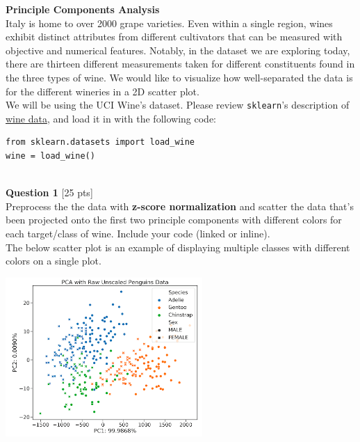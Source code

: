 \documentclass[paper=a4, fontsize=11pt]{scrartcl} %
\author{
    \textbf{YOUR NAME} \\ 
    \textbf{YOUR GIT USERNAME} \\ 
    \textbf{YOUR E-MAIL}
}%
\begin{document}
\maketitle %


{\huge \textbf{Principle Components Analysis}} \\

Italy is home to over 2000 grape varieties. Even within a single region, wines exhibit distinct attributes from different cultivators that can be measured with objective and numerical features. Notably, in the dataset we are exploring today, there are thirteen different measurements taken for different constituents found in the three types of wine. We would like to visualize how well-separated the data is for the different wineries in a 2D scatter plot.\\

We will be using the UCI Wine's dataset. Please review \verb"sklearn"'s description of \href{https://scikit-learn.org/stable/modules/generated/sklearn.datasets.load_wine.html}{wine data}, and load it in with the following code:
\begin{verbatim}
from sklearn.datasets import load_wine
wine = load_wine()
\end{verbatim} \\
\vspace{5mm}
{\Large \textbf{Question 1} [25 pts]} \\

Preprocess the the data with \textbf{z-score normalization} and scatter the data that's been projected onto the first two principle components with different colors for each target/class of wine. Include your code (linked or inline).\\

The below scatter plot is an example of displaying multiple classes with different colors on a single plot.

\begin{center}
    \includegraphics[width=75mm]{images/pca-example.png}
\end{center}
\end{document}
